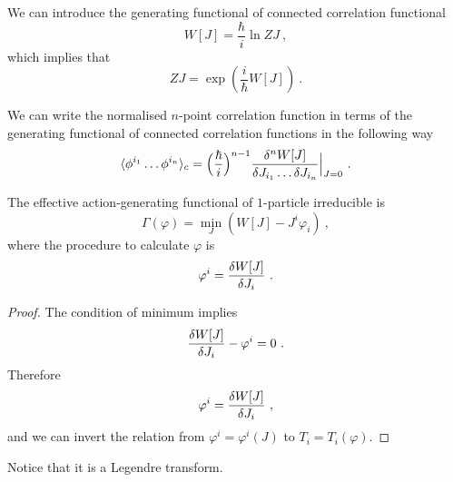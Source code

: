     We can introduce the generating functional of connected correlation functional 
    \begin{equation*}
        W[J] = \frac{\hbar}{i} \ln Z{J} ~,
    \end{equation*}
    which implies that 
    \begin{equation*}
        Z{J} = \exp (\frac{i}{\hbar} W[J]) ~.
    \end{equation*}

    We can write the normalised $n$-point correlation function in terms of the generating functional of connected correlation functions in the following way 
    \begin{equation*}
        \langle\phi^{i_1} \ldots \phi^{i_n}\rangle_c = \Big ( \frac{\hbar}{i} \Big)^{n-1} \frac{\delta^n W[J]}{\delta J_{i_1} \ldots \delta J_{i_n}} \Big \vert_{J=0} ~.
    \end{equation*}

    The effective action-generating functional of $1$-particle irreducible is 
    \begin{equation*}
        \Gamma (\varphi) = \min_J (W[J] - J^i \varphi_i) ~,
    \end{equation*}
    where the procedure to calculate $\varphi$ is 
    \begin{equation*}
        \varphi^i = \frac{\delta W[J]}{\delta J_i} ~.
    \end{equation*}
    \begin{proof}
        The condition of minimum implies 
        \begin{equation*}
            \frac{\delta W[J]}{\delta J_i} -  \varphi^i = 0 ~.
        \end{equation*}
        Therefore 
        \begin{equation*}
        \varphi^i = \frac{\delta W[J]}{\delta J_i} ~,
        \end{equation*}
        and we can invert the relation from $\varphi^i = \varphi^i (J)$ to $T_i = T_i(\varphi)$.
    \end{proof}

    Notice that it is a Legendre transform. 


